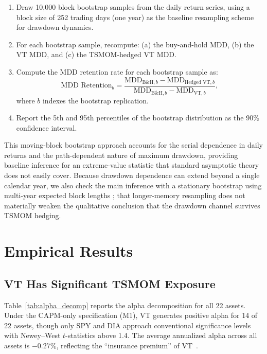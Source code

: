 \begin{enumerate}
\item Draw 10,000 block bootstrap samples from the daily return series, using a block size of 252 trading days (one year) as the baseline resampling scheme for drawdown dynamics.
\item For each bootstrap sample, recompute: (a) the buy-and-hold MDD, (b) the VT MDD, and (c) the TSMOM-hedged VT MDD.
\item Compute the MDD retention rate for each bootstrap sample as:
\begin{equation}
\text{MDD Retention}_b = \frac{\text{MDD}_{\text{B\&H},b} - \text{MDD}_{\text{Hedged VT},b}}{\text{MDD}_{\text{B\&H},b} - \text{MDD}_{\text{VT},b}},
\label{eq:mdd_retention_boot}
\end{equation}
where $b$ indexes the bootstrap replication.
\item Report the 5th and 95th percentiles of the bootstrap distribution as the 90\% confidence interval.
\end{enumerate}

This moving-block bootstrap approach accounts for the serial dependence in daily returns and the path-dependent nature of maximum drawdown, providing baseline inference for an extreme-value statistic that standard asymptotic theory does not easily cover. Because drawdown dependence can extend beyond a single calendar year, we also check the main inference with a stationary bootstrap using multi-year expected block lengths ; that longer-memory resampling does not materially weaken the qualitative conclusion that the drawdown channel survives TSMOM hedging.


\section{Empirical Results}

\subsection{VT Has Significant TSMOM Exposure}

Table~\ref{tab:alpha_decomp} reports the alpha decomposition for all 22 assets. Under the CAPM-only specification (M1), VT generates positive alpha for 14 of 22 assets, though only SPY and DIA approach conventional significance levels with Newey--West $t$-statistics above 1.4. The average annualized alpha across all assets is $-0.27\%$, reflecting the ``insurance premium'' of VT~\citep{lai2026a}.

